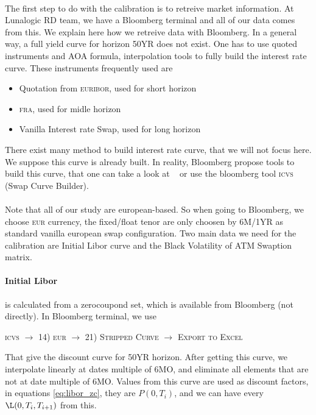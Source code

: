 \documentclass[a4paper,10pt]{article}
\newcommand{\bl}[1]{{\scshape  #1}}
\begin{document}
\paragraph{} The first step to do with the calibration is to retreive market information. At Lunalogic RD team, we have a Bloomberg terminal and all of our data comes from this. We explain here how we retreive data with Bloomberg. In a general way, a full yield curve for horizon 50YR does not exist. One has to use quoted instruments and AOA formula, interpolation tools to fully build the interest rate curve. These instruments frequently used are
\begin{itemize}
 \item Quotation from \bl{euribor}, used for short horizon
 \item \bl{fra}, used for midle horizon
 \item Vanilla Interest rate Swap, used for long horizon
\end{itemize}
There exist many method to build interest rate curve, that we will not focus here. We suppose this curve is already built. In reality, Bloomberg propose tools to build this curve, that one can take a look at ~\cite{BL2012} or use the bloomberg tool \bl{icvs} (Swap Curve Builder).
\paragraph{} Note that all of our study are european-based. So when going to Bloomberg, we choose \bl{eur} currency, the fixed/float tenor are only choosen by 6M/1YR as standard vanilla european swap configuration. Two main data we need for the calibration are Initial Libor curve and the Black Volatility of ATM Swaption matrix.   
\paragraph{Initial Libor} is calculated from a zerocoupond set, which is available from Bloomberg (not directly). In Bloomberg terminal, we use 
\begin{center}
\bl{icvs} $\longrightarrow$ \bl{14) eur} $\longrightarrow$ \bl{21) Stripped Curve} $\longrightarrow$  \bl{Export to Excel} 
\end{center}
That give the discount curve for 50YR horizon. After getting this curve, we interpolate linearly at dates multiple of 6MO, and eliminate all elements that are not at date multiple of 6MO. Values from this curve are used as discount factors, in equations \ref{eq:libor_zc}, they are $P(0,T_{i})$, and we can have every $\L(0,T_{i},T_{i+1})$ from this. 
\end{document}
